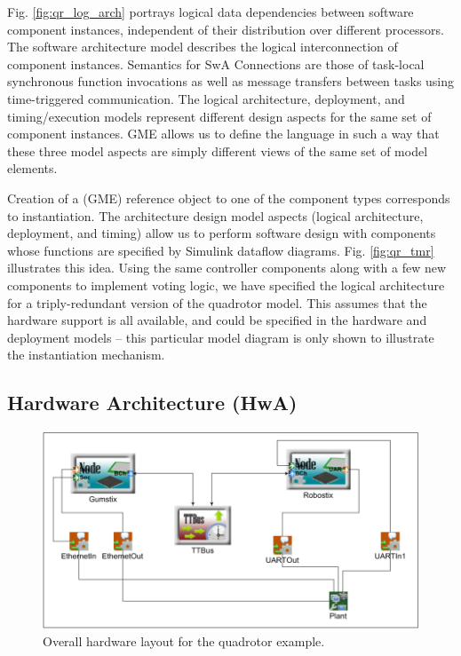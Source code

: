 Fig. \ref{fig:qr_log_arch} portrays logical data dependencies between
software component instances, independent of their distribution over different
processors.  The software architecture model describes the logical 
interconnection of component instances.  
Semantics for SwA Connections are those of task-local synchronous function 
invocations as well as message transfers between tasks using time-triggered 
communication.  The logical architecture, deployment, and timing/execution
models represent different design aspects for the same set of component 
instances.  GME allows us to define the language in such a way that these three
model aspects are simply different views of the same set of model elements.

Creation of a (GME) reference object to one of the component types corresponds to instantiation.
The architecture design model aspects (logical architecture, deployment, and timing) allow us to
perform software design with components whose functions are specified by Simulink dataflow diagrams.
Fig. \ref{fig:qr_tmr} illustrates this idea.  Using the same controller components along with a few new
components to implement voting logic, we have specified the logical architecture for a triply-redundant
version of the quadrotor model.  This assumes that the hardware support is all available, and could be
specified in the hardware and deployment models -- this particular model diagram is only shown to 
illustrate the instantiation mechanism.

\subsection{Hardware Architecture (HwA)}

\begin{figure}
  \centering
  \includegraphics[width=0.75\columnwidth]{figures/quadrotor_hardware.png}
  \caption{Overall hardware layout for the quadrotor example.}
  \label{fig:qr_hardware}
\end{figure}

